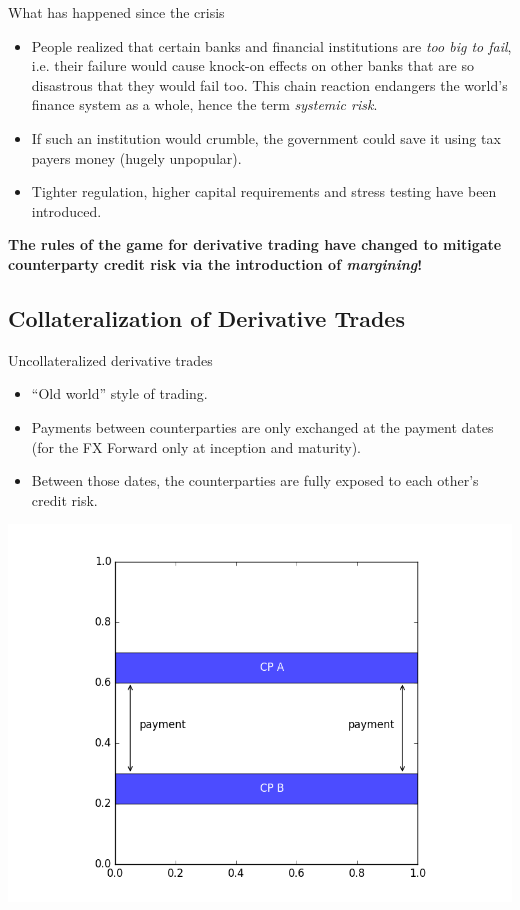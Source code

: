 \documentclass[t]{beamer}
\begin{document}
\begin{frame}{What has happened since the crisis}
	\begin{itemize}
	\item
		People realized that certain banks and financial institutions are \emph{too big to fail}, i.e. their failure would cause knock-on effects on other banks that are so disastrous that they would fail too. This chain reaction endangers the world's finance system as a whole, hence the term \emph{systemic risk}.
	\item
		If such an institution would crumble, the government could save it using tax payers money (hugely unpopular).
	\item
		Tighter regulation, higher capital requirements and stress testing have been introduced.
	\end{itemize}

	\begin{center}
		\textbf{The rules of the game for derivative trading have changed to mitigate counterparty credit risk via the introduction of \emph{margining}!}
	\end{center}
\end{frame}

\subsection{Collateralization of Derivative Trades}

\begin{frame}{Uncollateralized derivative trades}
	\begin{itemize}
		\item
			``Old world'' style of trading.
		\item 
			Payments between counterparties are only exchanged at the payment dates (for the FX Forward only at inception and maturity). 
		\item
			Between those dates, the counterparties are fully exposed to each other's credit risk.
	\end{itemize}
	\vspace{-2em}
	\begin{center}
		\includegraphics[scale=0.35]{pics/cashflows_uncoll.png}
	\end{center}	
\end{frame}
\end{document}
